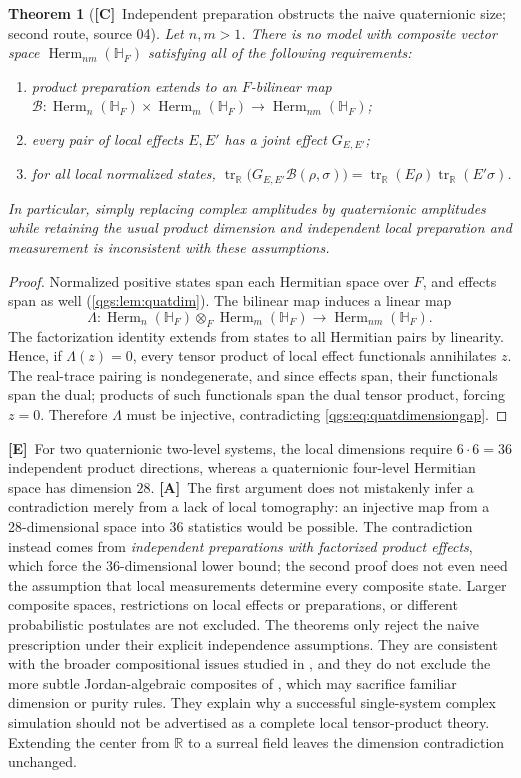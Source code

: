 \documentclass[11pt,oneside]{article}
\numberwithin{equation}{section}
\theoremstyle{plain}
\newtheorem{theorem}{Theorem}[section]
\theoremstyle{definition}
\theoremstyle{remark}
\newcommand{\R}{\mathbb R}
\newcommand{\HF}{\mathbb H_F}
\DeclareMathOperator{\tr}{tr}
\DeclareMathOperator{\Herm}{Herm}
\newcommand{\TE}{\textcolor{TierE}{\textsf{\bfseries[E]}}}
\newcommand{\TC}{\textcolor{TierC}{\textsf{\bfseries[C]}}}
\newcommand{\TA}{\textcolor{TierA}{\textsf{\bfseries[A]}}}
\begin{document}
\begin{theorem}[\TC\ Independent preparation obstructs the naive quaternionic size; second route, source 04]\label{qgs:hol:thm:composite}
Let $n,m>1$. There is no model with composite vector space $\Herm_{nm}(\HF)$ satisfying all of the following requirements:
\begin{enumerate}[label=\textup{(\arabic*)},leftmargin=2em,itemsep=2pt]
\item product preparation extends to an $F$-bilinear map $\mathcal B:\Herm_n(\HF)\times\Herm_m(\HF)\to\Herm_{nm}(\HF)$;
\item every pair of local effects $E,E'$ has a joint effect $G_{E,E'}$;
\item for all local normalized states, $\tr_\R\bigl(G_{E,E'}\mathcal B(\rho,\sigma)\bigr)=\tr_\R(E\rho)\tr_\R(E'\sigma)$.
\end{enumerate}
In particular, simply replacing complex amplitudes by quaternionic amplitudes while retaining the usual product dimension and independent local preparation and measurement is inconsistent with these assumptions.
\end{theorem}
\begin{proof}
Normalized positive states span each Hermitian space over $F$, and effects span as well (\cref{qgs:lem:quatdim}). The bilinear map induces a linear map
\[
 \Lambda:\Herm_n(\HF)\otimes_F\Herm_m(\HF)\longrightarrow\Herm_{nm}(\HF).
\]
The factorization identity extends from states to all Hermitian pairs by linearity. Hence, if $\Lambda(z)=0$, every tensor product of local effect functionals annihilates $z$. The real-trace pairing is nondegenerate, and since effects span, their functionals span the dual; products of such functionals span the dual tensor product, forcing $z=0$. Therefore $\Lambda$ must be injective, contradicting \eqref{qgs:eq:quatdimensiongap}.
\end{proof}

\TE\ For two quaternionic two-level systems, the local dimensions require $6\cdot6=36$ independent product directions, whereas a quaternionic four-level Hermitian space has dimension $28$. \TA\ The first argument does not mistakenly infer a contradiction merely from a lack of local tomography: an injective map from a 28-dimensional space into 36 statistics would be possible. The contradiction instead comes from \emph{independent preparations with factorized product effects}, which force the 36-dimensional lower bound; the second proof does not even need the assumption that local measurements determine every composite state. Larger composite spaces, restrictions on local effects or preparations, or different probabilistic postulates are not excluded. The theorems only reject the naive prescription under their explicit independence assumptions. They are consistent with the broader compositional issues studied in \cite{BarnumWilce}, and they do not exclude the more subtle Jordan-algebraic composites of \cite{BGW}, which may sacrifice familiar dimension or purity rules. They explain why a successful single-system complex simulation should not be advertised as a complete local tensor-product theory. Extending the center from $\R$ to a surreal field leaves the dimension contradiction unchanged.
\end{document}
